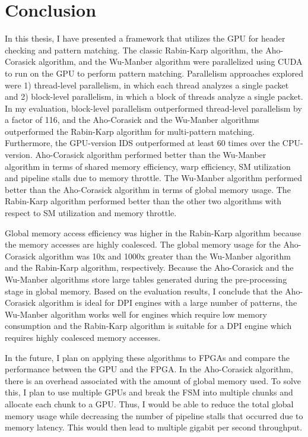\chapter{Conclusion}

In this thesis, I have presented a framework that utilizes the GPU for header checking and pattern matching. The classic Rabin-Karp algorithm, the Aho-Corasick algorithm, and the Wu-Manber algorithm were parallelized using CUDA to run on the GPU to perform pattern matching. Parallelism approaches explored were 1) thread-level parallelism, in which each thread analyzes a single packet and 2) block-level parallelism, in which a block of threads analyze a single packet. In my evaluation, block-level parallelism outperformed thread-level parallelism by a factor of 116, and the Aho-Corasick and the Wu-Manber algorithms outperformed the Rabin-Karp algorithm for multi-pattern matching. Furthermore, the GPU-version IDS outperformed at least 60 times over the CPU-version. Aho-Corasick algorithm performed better than the Wu-Manber algorithm in terms of shared memory efficiency, warp efficiency, SM utilization and pipeline stalls due to memory throttle. The Wu-Manber algorithm performed better than the Aho-Corasick algorithm in terms of global memory usage. The Rabin-Karp algorithm performed better than the other two algorithms with respect to SM utilization and memory throttle.

Global memory access efficiency was higher in the Rabin-Karp algorithm because the memory accesses are highly coalesced. The global memory usage for the Aho-Corasick algorithm was 10x and 1000x greater than the Wu-Manber algorithm and the Rabin-Karp algorithm, respectively. Because the Aho-Corasick and the Wu-Manber algorithms store large tables generated during the pre-processing stage in global memory. Based on the evaluation results, I conclude that the Aho-Corasick algorithm is ideal for DPI engines with a large number of patterns, the Wu-Manber algorithm works well for engines which require low memory consumption and the Rabin-Karp algorithm is suitable for a DPI engine which requires highly coalesced memory accesses. 
\bigskip

In the future, I plan on applying these algorithms to FPGAs and compare the performance between the GPU and the FPGA. In the Aho-Corasick algorithm, there is an overhead associated with the amount of global memory used. To solve this, I plan to use multiple GPUs and break the FSM into multiple chunks and allocate each chunk to a GPU. Thus, I would be able to reduce the total global memory usage while decreasing the number of pipeline stalls that occurred due to memory latency. This would then lead to multiple gigabit per second throughput. 